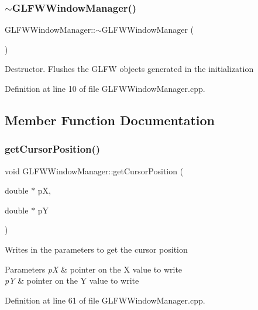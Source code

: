 \subsubsection{\texorpdfstring{$\sim$\+G\+L\+F\+W\+Window\+Manager()}{~GLFWWindowManager()}}
{\footnotesize\ttfamily G\+L\+F\+W\+Window\+Manager\+::$\sim$\+G\+L\+F\+W\+Window\+Manager (\begin{DoxyParamCaption}{ }\end{DoxyParamCaption})}

Destructor. Flushes the G\+L\+FW objects generated in the initialization 

Definition at line 10 of file G\+L\+F\+W\+Window\+Manager.\+cpp.



\subsection{Member Function Documentation}
\mbox{\label{class_g_l_f_w_window_manager_a5b283783f61366b19b3270d8fa7020f0}} 
\subsubsection{\texorpdfstring{get\+Cursor\+Position()}{getCursorPosition()}}
{\footnotesize\ttfamily void G\+L\+F\+W\+Window\+Manager\+::get\+Cursor\+Position (\begin{DoxyParamCaption}\item[{double $\ast$}]{pX,  }\item[{double $\ast$}]{pY }\end{DoxyParamCaption})}

Writes in the parameters to get the cursor position 
\begin{DoxyParams}{Parameters}
{\em pX} & pointer on the X value to write \\
\hline
{\em pY} & pointer on the Y value to write \\
\hline
\end{DoxyParams}


Definition at line 61 of file G\+L\+F\+W\+Window\+Manager.\+cpp.

\mbox{\label{class_g_l_f_w_window_manager_add348ae1a74b7d33d18df173277859d2}} 
